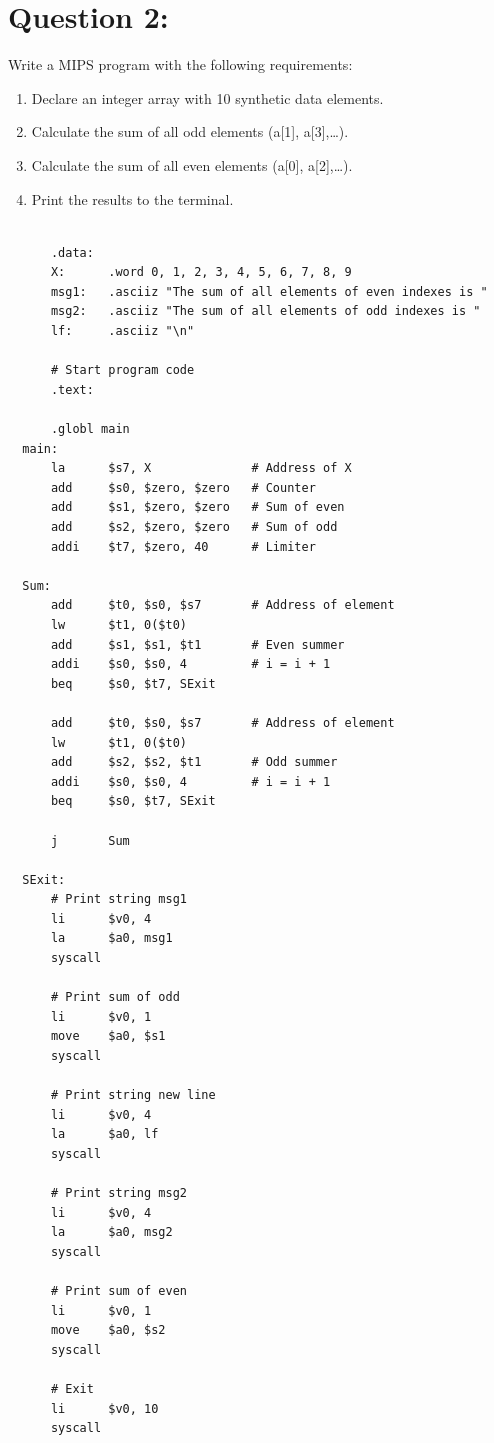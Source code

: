 \documentclass[12pt,a4paper]{article}
\begin{document}
\section*{Question 2:}
Write a MIPS program with the following requirements:
\begin{enumerate}[label=\alph*.]
  \item Declare an integer array with 10 synthetic data elements.
  \item Calculate the sum of all odd elements (a[1], a[3],\dots).
  \item Calculate the sum of all even elements (a[0], a[2],\dots).
  \item Print the results to the terminal.
\end{enumerate}

\begin{mdframed}[hidealllines=true,backgroundcolor=magenta!10]
  \begin{lstlisting}

      .data:
      X:      .word 0, 1, 2, 3, 4, 5, 6, 7, 8, 9
      msg1:   .asciiz "The sum of all elements of even indexes is "
      msg2:   .asciiz "The sum of all elements of odd indexes is "
      lf:     .asciiz "\n"

      # Start program code
      .text:

      .globl main
  main:
      la      $s7, X              # Address of X
      add     $s0, $zero, $zero   # Counter
      add     $s1, $zero, $zero   # Sum of even
      add     $s2, $zero, $zero   # Sum of odd
      addi    $t7, $zero, 40      # Limiter

  Sum:
      add     $t0, $s0, $s7       # Address of element
      lw      $t1, 0($t0)
      add     $s1, $s1, $t1       # Even summer
      addi    $s0, $s0, 4         # i = i + 1
      beq     $s0, $t7, SExit

      add     $t0, $s0, $s7       # Address of element
      lw      $t1, 0($t0)
      add     $s2, $s2, $t1       # Odd summer
      addi    $s0, $s0, 4         # i = i + 1
      beq     $s0, $t7, SExit

      j       Sum

  SExit:
      # Print string msg1
      li      $v0, 4
      la      $a0, msg1
      syscall

      # Print sum of odd
      li      $v0, 1
      move    $a0, $s1
      syscall

      # Print string new line
      li      $v0, 4
      la      $a0, lf
      syscall

      # Print string msg2
      li      $v0, 4
      la      $a0, msg2
      syscall

      # Print sum of even
      li      $v0, 1
      move    $a0, $s2
      syscall

      # Exit
      li      $v0, 10
      syscall

  \end{lstlisting}
\end{mdframed}
\end{document}
